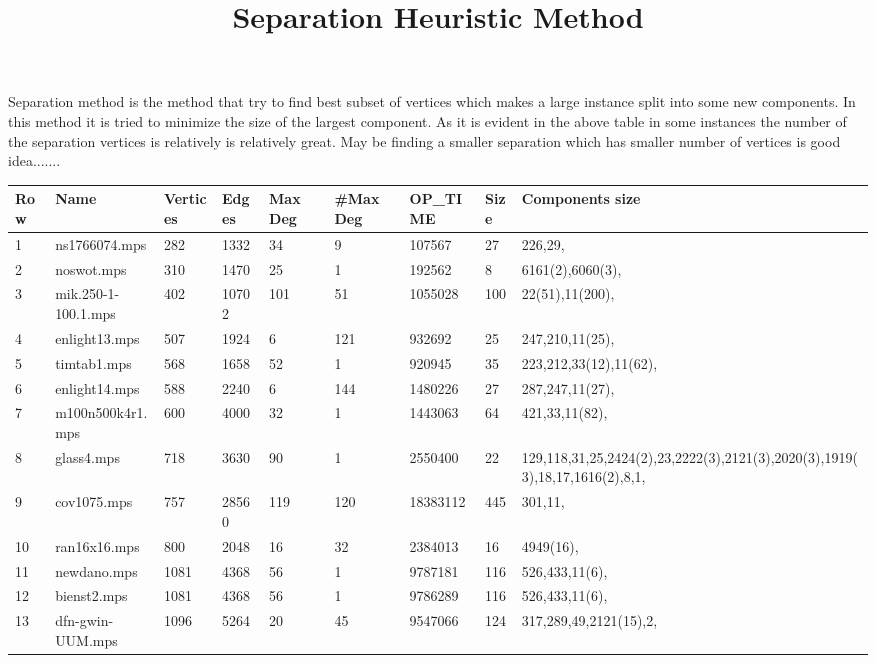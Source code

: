 \documentclass{article}
\title{Separation Heuristic Method}
\begin{document}
\maketitle
Separation method is the method that try to find best subset of vertices which makes a large instance split into some new components. In this method it is tried to minimize the size of the largest component. As it is evident in the above table in some instances the number of the separation vertices is relatively is relatively great. May be finding a smaller separation which has smaller number of vertices is good idea.......
\begin{longtable}{|l |l |l |l |l |l |l |l |l |}
\hline
Row&Name&Vertices&Edges&Max Deg&\#Max Deg&OP_TIME&Size&Components size\\
\hline
1&ns1766074.mps&282&1332&34&9&107567&27&226,29,\\
2&noswot.mps&310&1470&25&1&192562&8&6161(2),6060(3),\\
3&mik.250-1-100.1.mps&402&10702&101&51&1055028&100&22(51),11(200),\\
4&enlight13.mps&507&1924&6&121&932692&25&247,210,11(25),\\
5&timtab1.mps&568&1658&52&1&920945&35&223,212,33(12),11(62),\\
6&enlight14.mps&588&2240&6&144&1480226&27&287,247,11(27),\\
7&m100n500k4r1.mps&600&4000&32&1&1443063&64&421,33,11(82),\\
8&glass4.mps&718&3630&90&1&2550400&22&129,118,31,25,2424(2),23,2222(3),2121(3),2020(3),1919(3),18,17,1616(2),8,1,\\
9&cov1075.mps&757&28560&119&120&18383112&445&301,11,\\
10&ran16x16.mps&800&2048&16&32&2384013&16&4949(16),\\
11&newdano.mps&1081&4368&56&1&9787181&116&526,433,11(6),\\
12&bienst2.mps&1081&4368&56&1&9786289&116&526,433,11(6),\\
13&dfn-gwin-UUM.mps&1096&5264&20&45&9547066&124&317,289,49,2121(15),2,\\
\hline
\end{longtable}
\end{document}

